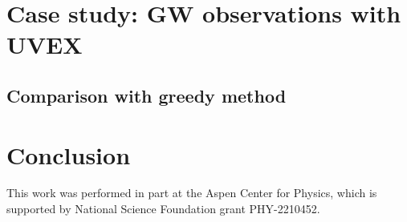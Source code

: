 \documentclass[twocolumn,times]{aastex631}
\begin{document}
\section{Case study: GW observations with UVEX}

\subsection{Comparison with greedy method}

\section{Conclusion}

\begin{acknowledgments}
This work was performed in part at the Aspen Center for Physics, which is supported by National Science Foundation grant PHY-2210452.
\end{acknowledgments}

\vspace{5mm}

{}

\end{document}
